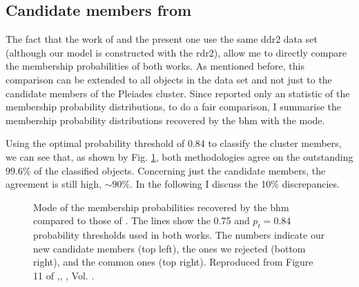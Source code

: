 \subsection{Candidate members from \citet{Bouy2015}}
\label{sect:comparisonBouy}

The fact that the work of \citet{Bouy2015} and the present one use the same \gls{ddr2} data set (although our model is constructed with the \gls{rdr2}), allow me to directly compare the membership probabilities of both works. As mentioned before, this comparison can be extended to all objects in the data set and not just to the candidate members of the Pleiades cluster. Since \citet{Bouy2015} reported only an statistic of the membership probability distributions, to do a fair comparison, I summarise the membership probability distributions recovered by the \gls{bhm} with the mode.

Using the optimal probability threshold of 0.84 to classify the cluster members, we can see that, as shown by Fig. \ref{fig:BHMBouy}, both methodologies agree on the outstanding $99.6$\% of the classified objects. Concerning just the candidate members, the agreement is still high, $\sim 90\%$. In the following I discuss the 10\% discrepancies.

\begin{figure}[ht!]
\begin{center}
\caption{Mode of the membership probabilities recovered by the \gls{bhm} compared to those of \citet{Bouy2015}. The lines show the 0.75 and $p_t=0.84$ probability thresholds used in both works. The numbers indicate our new candidate members (top left), the ones we rejected (bottom right), and the common ones (top right). Reproduced from Figure 11 of \citet{Olivares2017},\textit{}, , Vol. .}
\label{fig:BHMBouy}
\end{center}
\end{figure}


